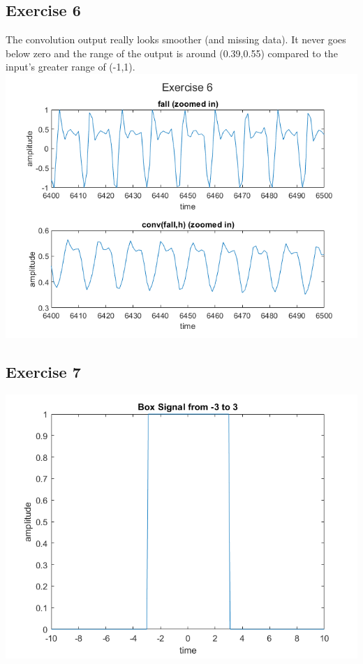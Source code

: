 \documentclass[11pt]{article}
\begin{document}
\pagebreak
\subsection{Exercise 6}

The convolution output really looks smoother (and missing data).
It never goes below zero and the range of the output is around (0.39,0.55) compared to the input's greater range of (-1,1).\\



\includegraphics[scale=0.6]{exercise6.png}

\subsection{Exercise 7}



\includegraphics[width=\textwidth]{exercise7.png}
\end{document}
